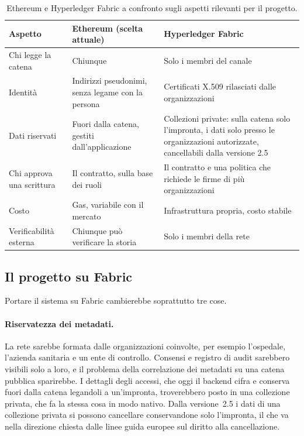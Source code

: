\begin{table}[H]
\centering\footnotesize
\renewcommand{\arraystretch}{1.2}
\begin{tabular}{@{}p{}p{}p{}@{}}
\toprule
Aspetto & Ethereum (scelta attuale) & Hyperledger Fabric\\
\midrule
Chi legge la catena & Chiunque & Solo i membri del canale\\
Identità & Indirizzi pseudonimi, senza legame con la persona & Certificati X.509 rilasciati dalle organizzazioni\\
Dati riservati & Fuori dalla catena, gestiti dall'applicazione & Collezioni private: sulla catena solo l'impronta, i dati solo presso le organizzazioni autorizzate, cancellabili dalla versione 2.5\\
Chi approva una scrittura & Il contratto, sulla base dei ruoli & Il contratto e una politica che richiede le firme di più organizzazioni\\
Costo & Gas, variabile con il mercato & Infrastruttura propria, costo stabile\\
Verificabilità esterna & Chiunque può verificare la storia & Solo i membri della rete\\
\bottomrule
\end{tabular}
\caption{Ethereum e Hyperledger Fabric a confronto sugli aspetti rilevanti per il progetto.}\label{tab:fabric}
\end{table}

\subsection{Il progetto su Fabric}
Portare il sistema su Fabric cambierebbe soprattutto tre cose.

\paragraph{Riservatezza dei metadati.} La rete sarebbe formata dalle organizzazioni coinvolte, per esempio l'ospedale, l'azienda sanitaria e un ente di controllo. Consensi e registro di audit sarebbero visibili solo a loro, e il problema della correlazione dei metadati su una catena pubblica sparirebbe. I dettagli degli accessi, che oggi il backend cifra e conserva fuori dalla catena legandoli a un'impronta, troverebbero posto in una collezione privata, che fa la stessa cosa in modo nativo. Dalla versione~2.5 i dati di una collezione privata si possono cancellare conservandone solo l'impronta\cite{fabric-purge}, il che va nella direzione chiesta dalle linee guida europee sul diritto alla cancellazione\cite{edpb-blockchain}.

